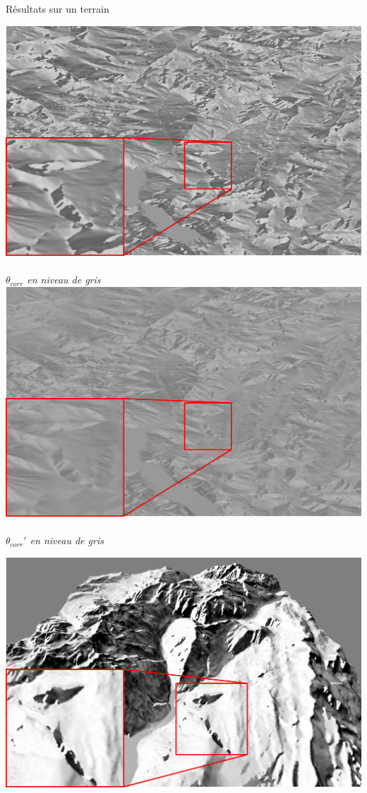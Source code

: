 \documentclass{beamer}
\begin{document}
\begin{frame}{Résultats sur un terrain}
\begin{center}
    \begin{minipage}[t]{0.4\linewidth}
    \begin{center}
    	\includegraphics[width=0.9\linewidth]{Resultats/theta_discontinu.png}~\\
 		\textit{$\theta_{corr}$ en niveau de gris}\\  
    	\includegraphics[width=0.9\linewidth]{Resultats/theta_continu.png}~\\
 		\textit{$\theta_{corr}'$ en niveau de gris}
    \end{center}
    \end{minipage}
	\hspace{0.2cm}
    \begin{minipage}[t]{0.4\linewidth}
    \begin{center}
    	\includegraphics[width=0.9\linewidth]{Resultats/ombrage_discontinue.png}~\\

\end{center}
\end{minipage}
\end{center}
\end{frame}
\end{document}
